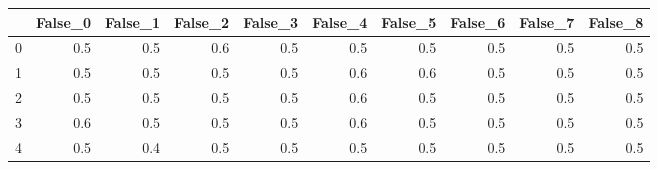 \begin{tabular}{lrrrrrrrrr}
\toprule
{} &  False\_0 &  False\_1 &  False\_2 &  False\_3 &  False\_4 &  False\_5 &  False\_6 &  False\_7 &  False\_8 \\ \hline
\midrule
0 &      0.5 &      0.5 &      0.6 &      0.5 &      0.5 &      0.5 &      0.5 &      0.5 &      0.5 \\ \hline
1 &      0.5 &      0.5 &      0.5 &      0.5 &      0.6 &      0.6 &      0.5 &      0.5 &      0.5 \\ \hline
2 &      0.5 &      0.5 &      0.5 &      0.5 &      0.6 &      0.5 &      0.5 &      0.5 &      0.5 \\ \hline
3 &      0.6 &      0.5 &      0.5 &      0.5 &      0.6 &      0.5 &      0.5 &      0.5 &      0.5 \\ \hline
4 &      0.5 &      0.4 &      0.5 &      0.5 &      0.5 &      0.5 &      0.5 &      0.5 &      0.5 \\ \hline
\bottomrule
\end{tabular}
